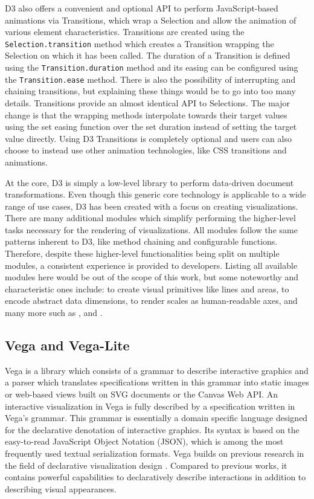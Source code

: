 D3 also offers a convenient and optional API to perform JavaScript-based animations via Transitions, which wrap a Selection and allow the animation of various element characteristics.
Transitions are created using the \lstinline{Selection.transition} method which creates a Transition wrapping the Selection on which it has been called.
The duration of a Transition is defined using the \lstinline{Transition.duration} method and its easing can be configured using the \lstinline{Transition.ease} method.
There is also the possibility of interrupting and chaining transitions, but explaining these things would be to go into too many details.
Transitions provide an almost identical API to Selections.
The major change is that the wrapping methods interpolate towards their target values using the set easing function over the set duration instead of setting the target value directly.
Using D3 Transitions is completely optional and users can also choose to instead use other animation technologies, like CSS transitions and animations.

At the core, D3 is simply a low-level library to perform data-driven document transformations.
Even though this generic core technology is applicable to a wide range of use cases, D3 has been created with a focus on creating visualizations.
There are many additional modules which simplify performing the higher-level tasks necessary for the rendering of visualizations.
All modules follow the same patterns inherent to D3, like method chaining and configurable functions.
Therefore, despite these higher-level functionalities being split on multiple modules, a consistent experience is provided to developers. 
Listing all available modules here would be out of the scope of this work, but some noteworthy and characteristic ones include:  to create visual primitives like lines and areas,  to encode abstract data dimensions,  to render scales as human-readable axes, and many more such as ,  and .

\subsection{Vega and Vega-Lite}

Vega \parencite{Vega} is a library which consists of a grammar to describe interactive graphics and a parser which translates specifications written in this grammar into static images or web-based views built on SVG documents or the Canvas Web API.
An interactive visualization in Vega is fully described by a specification written in Vega's grammar.
This grammar is essentially a domain specific language designed for the declarative denotation of interactive graphics.
Its syntax is based on the easy-to-read JavaScript Object Notation (JSON), which is among the most frequently used textual serialization formats.
Vega builds on previous research in the field of declarative visualization design \parencite{GrammarOfGraphics}.
Compared to previous works, it contains powerful capabilities to declaratively describe interactions \parencite{ReactiveVega} in addition to describing visual appearances.

